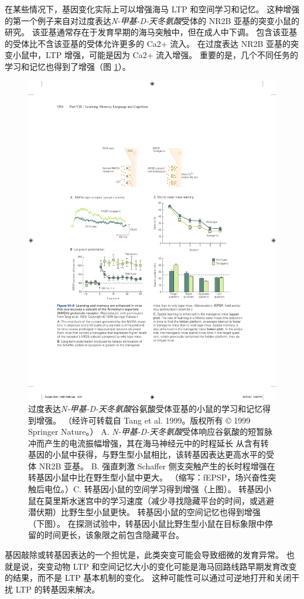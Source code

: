 在某些情况下，基因变化实际上可以增强海马 LTP 和空间学习和记忆。
这种增强的第一个例子来自对过度表达\textit{N-甲基-D-天冬氨酸}受体的 NR2B 亚基的突变小鼠的研究。
该亚基通常存在于发育早期的海马突触中，但在成人中下调。
包含该亚基的受体比不含该亚基的受体允许更多的 Ca2+ 流入。
在过度表达 NR2B 亚基的突变小鼠中，LTP 增强，可能是因为 Ca2+ 流入增强。
重要的是，几个不同任务的学习和记忆也得到了增强（图 \ref{fig:54_8}）。


\begin{figure}[htbp]
	\centering
	\includegraphics[width=0.75\linewidth]{chap54/fig_54_8}
	\caption{过度表达\textit{N-甲基-D-天冬氨酸}谷氨酸受体亚基的小鼠的学习和记忆得到增强。 （经许可转载自 Tang et al. 1999。版权所有 © 1999 Springer Nature。） A. \textit{N-甲基-D-天冬氨酸}受体响应谷氨酸的短暂脉冲而产生的电流振幅增强，其在海马神经元中的时程延长 从含有转基因的小鼠中获得，与野生型小鼠相比，该转基因表达更高水平的受体 NR2B 亚基。 B. 强直刺激 Schaffer 侧支突触产生的长时程增强在转基因小鼠中比在野生型小鼠中更大。 （缩写：fEPSP，场兴奋性突触后电位。）C. 转基因小鼠的空间学习得到增强（上图）。 转基因小鼠在莫里斯水迷宫中的学习速度（减少寻找隐藏平台的时间，或逃避潜伏期）比野生型小鼠更快。 转基因小鼠的空间记忆也得到增强（下图）。 在探测试验中，转基因小鼠比野生型小鼠在目标象限中停留的时间更长，该象限之前包含隐藏平台。}
	\label{fig:54_8}
\end{figure}


基因敲除或转基因表达的一个担忧是，此类突变可能会导致细微的发育异常。
也就是说，突变动物 LTP 和空间记忆大小的变化可能是海马回路线路早期发育改变的结果，而不是 LTP 基本机制的变化。
这种可能性可以通过可逆地打开和关闭干扰 LTP 的转基因来解决。


